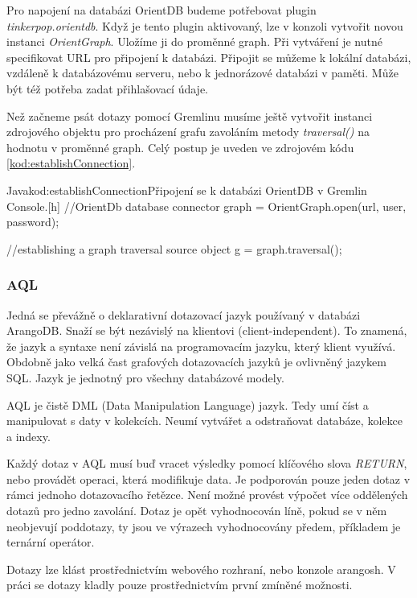\documentclass[
  program=infoi,
  biblatex=true,
  sourcecodes=true,
  figures=true,
  glossaries=false,
  index
]{kidiplom}
\begin{document}
Pro napojení na databázi OrientDB budeme potřebovat plugin \textit{tinkerpop.orientdb}. Když je tento plugin aktivovaný, lze v konzoli vytvořit novou instanci \textit{OrientGraph}. Uložíme ji do proměnné graph. Při vytváření je nutné specifikovat URL pro připojení k databázi. Připojit se můžeme k lokální databázi, vzdáleně k databázovému serveru, nebo k jednorázové databázi v paměti. Může být též potřeba zadat přihlašovací údaje.

Než začneme psát dotazy pomocí Gremlinu musíme ještě vytvořit instanci zdrojového objektu pro procházení grafu zavoláním metody \textit{traversal()} na hodnotu v proměnné graph. Celý postup je uveden ve zdrojovém kódu \ref{kod:establishConnection}.

\begin{kicode}{Java}{kod:establishConnection}{Připojení se k databázi OrientDB v Gremlin Console.}[h]
//OrientDb database connector
graph = OrientGraph.open(url, user, password);

//establishing a graph traversal source object
g = graph.traversal();
\end{kicode}

\subsubsection{AQL}
\cite{arangoDBDoc}
Jedná se převážně o deklarativní dotazovací jazyk používaný v databázi ArangoDB. Snaží se být nezávislý na klientovi (client-independent). To znamená, že jazyk a syntaxe není závislá na programovacím jazyku, který klient využívá. Obdobně jako velká čast grafových dotazovacích jazyků je ovlivněný jazykem SQL. Jazyk je jednotný pro všechny databázové modely.

AQL je čistě DML (Data Manipulation Language) jazyk. Tedy umí číst a manipulovat s daty v kolekcích. Neumí vytvářet a odstraňovat databáze, kolekce a indexy.

Každý dotaz v AQL musí buď vracet výsledky pomocí klíčového slova \textit{RETURN}, nebo provádět operaci, která modifikuje data. Je podporován pouze jeden dotaz v rámci jednoho dotazovacího řetězce. Není možné provést výpočet více oddělených dotazů pro jedno zavolání. Dotaz je opět vyhodnocován líně, pokud se v něm neobjevují poddotazy, ty jsou ve výrazech vyhodnocovány předem, příkladem je ternární operátor.

Dotazy lze klást prostřednictvím webového rozhraní, nebo konzole arangosh. V práci se dotazy kladly pouze prostřednictvím první zmíněné možnosti.
\end{document}
